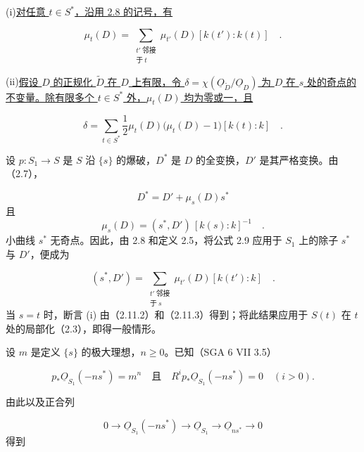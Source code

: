 (i)\quad \underline{对任意 $t\in S^*$，沿用 2.8 的记号，有}

\begin{equation*}
\mu_t(D)
=\sum_{\substack{t'\ \text{邻接}\\\text{于}\ t}}
\mu_{t'}(D)[k(t'):k(t)] \quad .
\end{equation*}

(ii)\quad \underline{假设 $D$ 的正规化 $\widetilde D$ 在 $D$ 上有限，令 $\delta=\chi(\underline{O}_{\widetilde D}/\underline{O}_D)$ 为 $D$ 在 $s$ 处的奇点的不变量。除有限多个 $t\in S^*$ 外，$\mu_t(D)$ 均为零或一，且}

\begin{equation*}
\delta
=\sum_{t\in S^*}\frac12\mu_t(D)\bigl(\mu_t(D)-1\bigr)[k(t):k] \quad .
\end{equation*}

设 $p:S_1\longrightarrow S$ 是 $S$ 沿 $\{s\}$ 的爆破，$D^*$ 是 $D$ 的全变换，$D'$ 是其严格变换。由（2.7），

\begin{equation}\tag{2.11.1}
D^*=D'+\mu_s(D)s^*
\end{equation}
且
\begin{equation}\tag{2.11.2}
\mu_s(D)=(s^*,D')\,[k(s):k]^{-1} \quad .
\end{equation}
小曲线 $s^*$ 无奇点。因此，由 2.8 和定义 2.5，将公式 2.9 应用于 $S_1$ 上的除子 $s^*$ 与 $D'$，便成为

\begin{equation}\tag{2.11.3}
(s^*,D')
=\sum_{\substack{t'\ \text{邻接}\\\text{于}\ s}}
\mu_{t'}(D)[k(t'):k] \quad .
\end{equation}
当 $s=t$ 时，断言 (i) 由（2.11.2）和（2.11.3）得到；将此结果应用于 $S(t)$ 在 $t$ 处的局部化（2.3），即得一般情形。

设 $m$ 是定义 $\{s\}$ 的极大理想，$n\geq0$。已知（SGA 6 VII 3.5）

\begin{equation}\tag{2.11.4}
p_*\underline{O}_{S_1}(-ns^*)=m^n
\quad\text{且}\quad
R^ip_*\underline{O}_{S_1}(-ns^*)=0\quad(i>0).
\end{equation}


由此以及正合列

\begin{equation*}
0\longrightarrow\underline{O}_{S_1}(-ns^*)
\longrightarrow\underline{O}_{S_1}
\longrightarrow\underline{O}_{ns^*}
\longrightarrow0
\end{equation*}
得到

